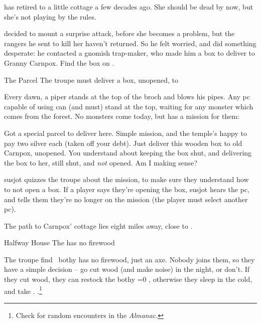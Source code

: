 \documentclass[10pt,twoside]{book}
\begin{document}


\vspace{-1em}



\noindent
{} has retired to a little cottage a few decades ago.
She should be dead by now, but she's not playing by the rules.

 decided to mount a surprise attack, before she becomes a problem, but the \glspl{ranger} he sent to kill her haven't returned.
So he felt worried, and did something desperate: he contacted a gnomish trap-maker, who made him a box to deliver to Granny Carnpox.
Find the box on .

{The Parcel}%
{The troupe must deliver a box, unopened, to }%

\pagestyle{minizine}%

Every dawn, a piper stands at the top of the \gls{broch} and blows his pipes.
Any \gls{pc} capable of using  can (and must) stand at the top, waiting for any \gls{monster} which comes from the forest.
No \glspl{monster} come today, but  has a mission for them:

\begin{speechtext}
  Got a special parcel to deliver here.
  Simple mission, and the temple's happy to pay two silver each (taken off your debt).
  Just deliver this wooden box to old Carnpox, unopened.
  You understand about keeping the box shut, and delivering the box to her, still shut, and \emph{not} opened.
  Am I making sense?
\end{speechtext}

\Gls{susjot} quizzes the troupe about the mission, to make sure they understand how to not open a box.
If a player says they're opening the box, \gls{susjot} hears the \gls{pc}, and tells them they're no longer on the mission
(the player must select another \gls{pc}).

The path to Carnpox' cottage lies eight miles away, close to .

{Halfway House}%
{The  has no firewood}%

The troupe find \composeHumanName~\gls{bothy} has no firewood, just an axe.
Nobody joins them, so they have a simple decision -- go cut wood (and make noise) in the night, or don't.
If they cut wood, they can restock the \gls{bothy}%
\ifnum\value{temperature}=0
  , otherwise they sleep in the cold, and take .
\else%
  .\footnote{Check for random encounters in the \textit{Almanac}.}
\fi
\end{document}

